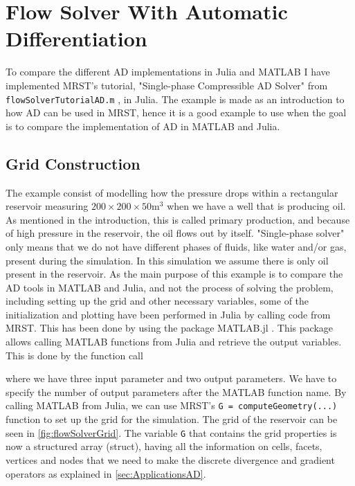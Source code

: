 \chapter{Flow Solver With Automatic Differentiation}
\label{ch:FlowSolver}
To compare the different AD implementations in Julia and MATLAB I have implemented MRST's tutorial, "Single-phase Compressible AD Solver" from \texttt{flowSolverTutorialAD.m} \emph{\citep{flowSolverADExample}}, in Julia. The example is made as an introduction to how AD can be used in MRST, hence it is a good example to use when the goal is to compare the implementation of AD in MATLAB and Julia. 

\section{Grid Construction}
\label{sec:GridConstruction}
The example consist of modelling how the pressure drops within a rectangular reservoir measuring $200\times 200 \times 50 \text{m}^3$ when we have a well that is producing oil. As mentioned in the introduction, this is called primary production, and because of high pressure in the reservoir, the oil flows out by itself. "Single-phase solver" only means that we do not have different phases of fluids, like water and/or gas, present during the simulation. In this simulation we assume there is only oil present in the reservoir. As the main purpose of this example is to compare the AD tools in MATLAB and Julia, and not the process of solving the problem, including setting up the grid and other necessary variables, some of the initialization and plotting have been performed in Julia by calling code from MRST. This has been done by using the package MATLAB.jl \emph{\citep{MATLAB.jl}}. This package allows calling MATLAB functions from Julia and retrieve the output variables. This is done by the function call

where we have three input parameter and two output parameters. We have to specify the number of output parameters after the MATLAB function name.  By calling MATLAB from Julia, we can use MRST's \texttt{G = computeGeometry(...)} function to set up the grid for the simulation. The grid of the reservoir can be seen in \autoref{fig:flowSolverGrid}. The variable \texttt{G} that contains the grid properties is now a structured array (struct), having all the information on cells, facets, vertices and nodes that we need to make the discrete divergence and gradient operators as explained in \autoref{sec:ApplicationsAD}. 

